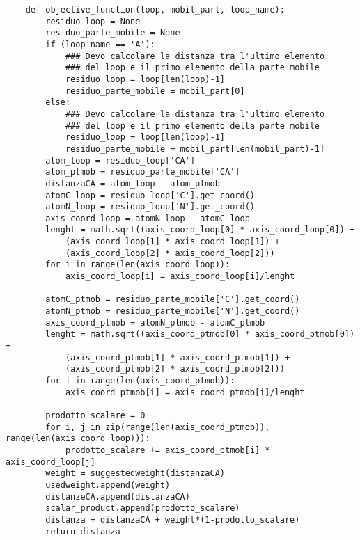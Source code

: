 \begin{verbatim}
    def objective_function(loop, mobil_part, loop_name):
        residuo_loop = None
        residuo_parte_mobile = None
        if (loop_name == 'A'):
            ### Devo calcolare la distanza tra l'ultimo elemento 
            ### del loop e il primo elemento della parte mobile
            residuo_loop = loop[len(loop)-1]
            residuo_parte_mobile = mobil_part[0]
        else:
            ### Devo calcolare la distanza tra l'ultimo elemento 
            ### del loop e il primo elemento della parte mobile
            residuo_loop = loop[len(loop)-1]
            residuo_parte_mobile = mobil_part[len(mobil_part)-1] 
        atom_loop = residuo_loop['CA']
        atom_ptmob = residuo_parte_mobile['CA']
        distanzaCA = atom_loop - atom_ptmob
        atomC_loop = residuo_loop['C'].get_coord()
        atomN_loop = residuo_loop['N'].get_coord()
        axis_coord_loop = atomN_loop - atomC_loop
        lenght = math.sqrt((axis_coord_loop[0] * axis_coord_loop[0]) + 
            (axis_coord_loop[1] * axis_coord_loop[1]) + 
            (axis_coord_loop[2] * axis_coord_loop[2]))
        for i in range(len(axis_coord_loop)):
            axis_coord_loop[i] = axis_coord_loop[i]/lenght

        atomC_ptmob = residuo_parte_mobile['C'].get_coord()
        atomN_ptmob = residuo_parte_mobile['N'].get_coord()
        axis_coord_ptmob = atomN_ptmob - atomC_ptmob
        lenght = math.sqrt((axis_coord_ptmob[0] * axis_coord_ptmob[0]) + 
            (axis_coord_ptmob[1] * axis_coord_ptmob[1]) + 
            (axis_coord_ptmob[2] * axis_coord_ptmob[2]))
        for i in range(len(axis_coord_ptmob)):
            axis_coord_ptmob[i] = axis_coord_ptmob[i]/lenght
        
        prodotto_scalare = 0
        for i, j in zip(range(len(axis_coord_ptmob)), range(len(axis_coord_loop))):
            prodotto_scalare += axis_coord_ptmob[i] * axis_coord_loop[j]
        weight = suggestedweight(distanzaCA)
        usedweight.append(weight)
        distanzeCA.append(distanzaCA)
        scalar_product.append(prodotto_scalare)
        distanza = distanzaCA + weight*(1-prodotto_scalare)
        return distanza
\end{verbatim}

